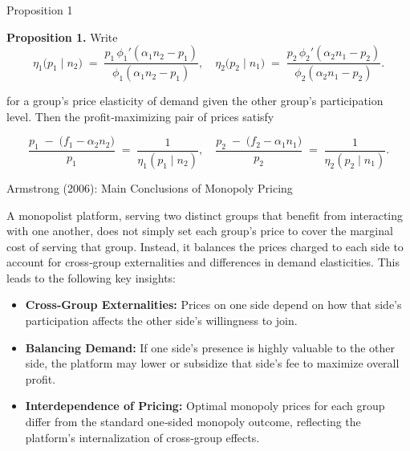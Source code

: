 \documentclass[aspectratio=169]{beamer}  %
\begin{document}
\begin{frame}{Proposition 1}
    \justifying  %
    
    \textbf{Proposition 1.} Write
    \[
      \eta_{1}\bigl(p_{1} \mid n_{2}\bigr) 
      \;=\; 
      \frac{p_{1}\,\phi_{1}'(\alpha_{1}n_{2} - p_{1})}{\phi_{1}(\alpha_{1}n_{2} - p_{1})},
      \quad
      \eta_{2}\bigl(p_{2} \mid n_{1}\bigr) 
      \;=\;
      \frac{p_{2}\,\phi_{2}'(\alpha_{2}n_{1} - p_{2})}{\phi_{2}(\alpha_{2}n_{1} - p_{2})}.
    \]
    
    for a group’s price elasticity of demand given the other group’s participation level.  
    Then the profit‐maximizing pair of prices satisfy
    
    \[
      \frac{p_{1} \;-\; \bigl(f_{1} - \alpha_{2}n_{2}\bigr)}{p_{1}}
      \;=\;
      \frac{1}{\eta_{1}(p_{1} \mid n_{2})},
      \quad
      \frac{p_{2} \;-\; \bigl(f_{2} - \alpha_{1}n_{1}\bigr)}{p_{2}}
      \;=\;
      \frac{1}{\eta_{2}(p_{2} \mid n_{1})}.
    \]
    
    \end{frame}

\begin{frame}{Armstrong (2006): Main Conclusions of Monopoly Pricing}
    \justifying  %
    
    A monopolist platform, serving two distinct groups that benefit from interacting 
    with one another, does not simply set each group’s price to cover the marginal 
    cost of serving that group. Instead, it balances the prices charged to each side 
    to account for cross‐group externalities and differences in demand elasticities.
    This leads to the following key insights:
    
    \begin{itemize}
        \item \textbf{Cross‐Group Externalities:} Prices on one side depend on how 
        that side’s participation affects the other side’s willingness to join.
    
        \item \textbf{Balancing Demand:} If one side’s presence is highly valuable 
        to the other side, the platform may lower or subsidize that side’s fee 
        to maximize overall profit.
    
        \item \textbf{Interdependence of Pricing:} Optimal monopoly prices for each 
        group differ from the standard one‐sided monopoly outcome, reflecting 
        the platform’s internalization of cross‐group effects.
    \end{itemize}
    
\end{frame}
    
\end{document}

